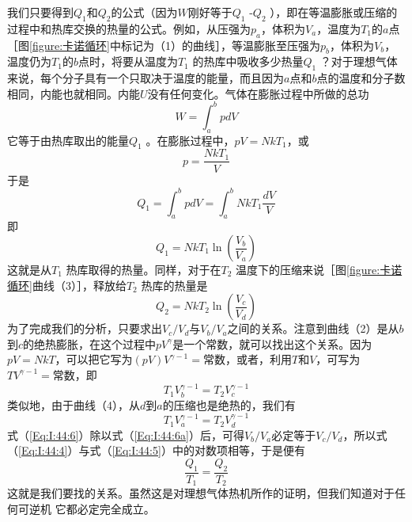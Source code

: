 我们只要得到$Q_1$和$Q_2$的公式（因为$W$刚好等于$Q_1$ -$Q_2$ ），即在等温膨胀或压缩的过程中和热库交换的热量的公式。例如，从压强为$p_a$，体积为$V_a$，温度为$T_1$的$a$点［图\ref{figure:卡诺循环}中标记为（1）的曲线］，等温膨胀至压强为$p_b$，体积为$V_b$，温度仍为$T_1$的$b$点时，将要从温度为$T_1$ 的热库中吸收多少热量$Q_1$ ？对于理想气体来说，每个分子具有一个只取决于温度的能量，而且因为$a$点和$b$点的温度和分子数相同，内能也就相同。内能$U$没有任何变化。气体在膨胀过程中所做的总功
\begin{equation*}
    W=\int_a^b pdV
\end{equation*}
它等于由热库取出的能量$Q_1$ 。在膨胀过程中，$pV =NkT_1$，或
\begin{equation*}
    p=\frac{NkT_1}{V}
\end{equation*}
于是
\begin{equation}
    \label{Eq:I:44:4}
    Q_1 = \int_a^b pdV = \int_a^b NkT_1\frac{dV}{V}
\end{equation}
即
\begin{equation*}
    Q_1 = NkT_1\ln\left(\frac{V_b}{V_a}\right)
\end{equation*}
这就是从$T_1$ 热库取得的热量。同样，对于在$T_2$ 温度下的压缩来说［图\ref{figure:卡诺循环}曲线（3）］，释放给$T_2$ 热库的热量是
\begin{equation}
    \label{Eq:I:44:5}
    Q_2 = NkT_2\ln\left(\frac{V_c}{V_d}\right)
\end{equation}
为了完成我们的分析，只要求出$V_c /V_d$与$V_b /V_a$之间的关系。注意到曲线（2）是从$b $到$c $的绝热膨胀，在这个过程中$pV^{\gamma}$是一个常数，就可以找出这个关系。因为$pV=NkT$，可以把它写为$(pV)V^{\gamma -1} =\text{常数}$，或者，利用$T$和$V$，可写为$TV^{\gamma -1} =\text{常数}$，即
\begin{equation}
    \label{Eq:I:44:6}
    T_1V_b^{\gamma -1}=T_2V_c^{\gamma -1}
\end{equation}
类似地，由于曲线（4），从$d$到$a$的压缩也是绝热的，我们有
\begin{equation}
    \label{Eq:I:44:6a}
    \tag{44.6a}
    T_1V_a^{\gamma -1}=T_2V_d^{\gamma -1}
\end{equation}
式（\ref{Eq:I:44:6}）除以式（\ref{Eq:I:44:6a}）后，可得$V_b /V_a$必定等于$V_c /V_d$，所以式（\ref{Eq:I:44:4}）与式（\ref{Eq:I:44:5}）中的对数项相等，于是便有
\begin{equation}
    \label{Eq:I:44:7}
    \frac{Q_1}{T_1} = \frac{Q_2}{T_2}
\end{equation}
这就是我们要找的关系。虽然这是对理想气体热机所作的证明，但我们知道对于任何可逆机 它都必定完全成立。

